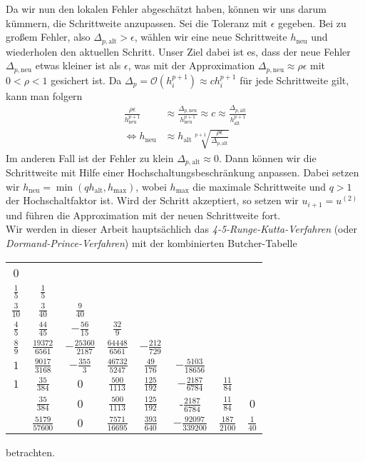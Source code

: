 Da wir nun den lokalen Fehler abgeschätzt haben, können wir uns darum kümmern, die Schrittweite anzupassen. Sei die
Toleranz mit $\epsilon$ gegeben. Bei zu großem Fehler, also $\Delta_{p, \text{alt}} > \epsilon$, wählen wir eine neue
Schrittweite $h_{\text{neu}}$ und wiederholen den aktuellen Schritt. Unser Ziel dabei ist es, dass der neue Fehler
$\Delta_{p, \text{neu}}$ etwas kleiner ist als $\epsilon$, was mit der Approximation
$\Delta_{p, \text{neu}} \approx \rho \epsilon$ mit $0 < \rho < 1$ gesichert ist. Da
$\Delta_p = \mathcal{O}(h_i^{p+1}) \approx ch_i^{p+1}$ für jede Schrittweite gilt, kann man folgern
\begin{align*}
    \frac{\rho \epsilon}{h_{\text{neu}}^{p+1}}
    &\approx \frac{\Delta_{p, \text{neu}}}{h_{\text{neu}}^{p+1}}
    \approx c
    \approx \frac{\Delta_{p, \text{alt}}}{h_{\text{alt}}^{p+1}}\\
    \Leftrightarrow h_{\text{neu}} &\approx h_{\text{alt}} \sqrt[p+1]{\frac{\rho \epsilon}{\Delta_{p, \text{alt}}}}
\end{align*}
Im anderen Fall ist der Fehler zu klein $\Delta_{p, \text{alt}} \approx 0$. Dann können wir die Schrittweite mit Hilfe
einer Hochschaltungsbeschränkung anpassen. Dabei setzen wir $h_{\text{neu}} = \min(q h_{\text{alt}}, h_{\text{max}})$,
wobei $h_{\text{max}}$ die maximale Schrittweite und $q>1$ der Hochschaltfaktor ist. Wird der Schritt akzeptiert, so
setzen wir $u_{i+1} = u^{(2)}$ und führen die Approximation mit der neuen Schrittweite fort.\\
Wir werden in dieser Arbeit hauptsächlich das \textit{4-5-Runge-Kutta-Verfahren} (oder \textit{Dormand-Prince-Verfahren})
mit der kombinierten Butcher-Tabelle
\begin{center}
    \begin{tabular}{c | c c c c c c c}
        0 & & & & & & & \\
        $\frac{1}{5}$ & $\frac{1}{5}$ & & & & & & \\
        $\frac{3}{10}$ & $\frac{3}{40}$ & $\frac{9}{40}$ & & & & & \\
        $\frac{4}{5}$ & $\frac{44}{45}$ & $-\frac{56}{15}$ & $\frac{32}{9}$ & & & & \\
        $\frac{8}{9}$ & $\frac{19372}{6561}$ & $-\frac{25360}{2187}$ & $\frac{64448}{6561}$ & $-\frac{212}{729}$ & & & \\
        $1$ & $\frac{9017}{3168}$ & $-\frac{355}{3}$ & $\frac{46732}{5247}$ & $\frac{49}{176}$ & $-\frac{5103}{18656}$ & & \\
        $1$ & $\frac{35}{384}$ & $0$ & $\frac{500}{1113}$ & $\frac{125}{192}$ & $-\frac{2187}{6784}$ & $\frac{11}{84}$ & \\
        \hline
        & $\frac{35}{384}$ & $0$ & $\frac{500}{1113}$ & $\frac{125}{192}$ & -$\frac{2187}{6784}$ & $\frac{11}{84}$ & $0$\\
        \hline
        & $\frac{5179}{57600}$ &  $0$ & $\frac{7571}{16695}$ & $\frac{393}{640}$ & $-\frac{92097}{339200}$
        & $\frac{187}{2100}$ & $\frac{1}{40}$ \\
    \end{tabular}
\end{center}
betrachten.

